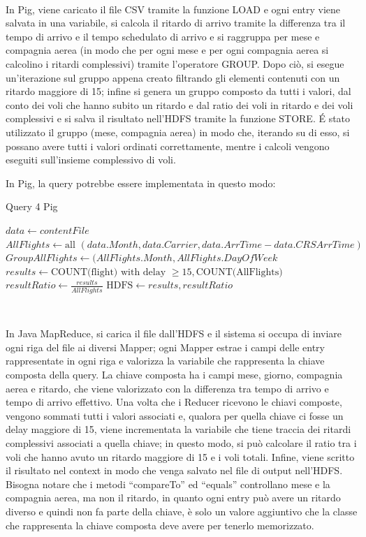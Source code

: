 \documentclass[11pt]{article} %
\begin{document}
~

In Pig, viene caricato il file CSV tramite la funzione LOAD e ogni entry viene salvata in una variabile, si calcola il ritardo di arrivo tramite la differenza tra il tempo di arrivo e il tempo schedulato di arrivo e si raggruppa per mese e compagnia aerea (in modo che per ogni mese e per ogni compagnia aerea si calcolino i ritardi complessivi) tramite l'operatore GROUP. Dopo ciò, si esegue un'iterazione sul gruppo appena creato filtrando gli elementi contenuti con un ritardo maggiore di 15; infine si genera un gruppo composto da tutti i valori, dal conto dei voli che hanno subito un ritardo e dal ratio dei voli in ritardo e dei voli complessivi e si salva il risultato nell'HDFS tramite la funzione STORE. \'E stato utilizzato il gruppo (mese, compagnia aerea) in modo che, iterando su di esso, si possano avere tutti i valori ordinati correttamente, mentre i calcoli vengono eseguiti sull'insieme complessivo di voli. 

In Pig, la query potrebbe essere implementata in questo modo:

\begin{algorithm}
\caption{Query 4 Pig}\label{euclid}
\begin{algorithmic}[0]
\State $data \gets contentFile$
\State $AllFlights \gets \text{all } (data.Month, data.Carrier, data.ArrTime - data.CRSArrTime)$
\State $GroupAllFlights \gets (AllFlights.Month, AllFlights.DayOfWeek$
	\State $results \gets \text{COUNT(flight) with delay }  \geqslant 15, \text{COUNT(AllFlights) }$
	\State $resultRatio \gets \frac{results}{AllFlights}$
\EndFor
\State $\text{HDFS}\gets results, resultRatio$
\end{algorithmic}
\end{algorithm}

~

In Java MapReduce, si carica il file dall'HDFS e il sistema si occupa di inviare ogni riga del file ai diversi Mapper; ogni Mapper estrae i campi delle entry rappresentate in ogni riga e valorizza la variabile che rappresenta la chiave composta della query. La chiave composta ha i campi mese, giorno, compagnia aerea e ritardo, che viene valorizzato con la differenza tra tempo di arrivo e tempo di arrivo effettivo. Una volta che i Reducer ricevono le chiavi composte, vengono sommati tutti i valori associati e, qualora per quella chiave ci fosse un delay maggiore di 15, viene incrementata la variabile che tiene traccia dei ritardi complessivi associati a quella chiave; in questo modo, si può calcolare il ratio tra i voli che hanno avuto un ritardo maggiore di 15 e i voli totali. Infine, viene scritto il risultato nel context in modo che venga salvato nel file di output nell'HDFS.  Bisogna notare che i metodi ``compareTo'' ed ``equals'' controllano mese e la compagnia aerea, ma non il ritardo, in quanto ogni entry può avere un ritardo diverso e quindi non fa parte della chiave, è solo un valore aggiuntivo che la classe che rappresenta la chiave composta deve avere per tenerlo memorizzato. 
\end{document}
